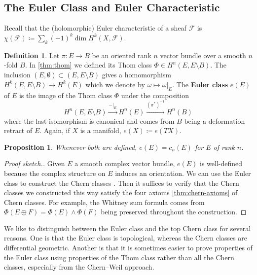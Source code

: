\documentclass{report}
\theoremstyle{plain}
\newtheorem{proposition}[theorem]{Proposition}
\theoremstyle{definition}
\newtheorem{definition}[theorem]{Definition}
\theoremstyle{remark}
\newcommand{\cF}{\mathcal{F}}
\begin{document}
\subsection{The Euler Class and Euler Characteristic}

Recall that the (holomorphic) Euler characteristic of a sheaf $\cF$ is
$\chi(\cF) \coloneqq \sum_k (-1)^k \dim H^k(X, \cF)$.

\begin{definition} \label{def:euler-class}
  Let $\pi\colon E \to B$ be an oriented rank $n$ vector bundle over a
  smooth $n$-fold $B$. In \ref{thm:thom} we defined its Thom class
  $\Phi \in H^n(E, E \setminus B)$. The inclusion $(E, \emptyset)
  \subset (E, E \setminus B)$ gives a homomorphism $H^k(E, E \setminus
  B) \to H^k(E)$ which we denote by $\omega \mapsto \omega|_E$. The
  {\bf Euler class} $e(E)$ of $E$ is the image of the Thom class
  $\Phi$ under the composition
  \[ H^n(E, E \setminus B) \xrightarrow{-|_E} H^n(E) \xrightarrow{(\pi^*)^{-1}} H^n(B) \]
  where the last isomorphism is canonical and comes from $B$ being a
  deformation retract of $E$. Again, if $X$ is a manifold, $e(X)
  \coloneqq e(TX)$.
\end{definition}

\begin{proposition} \label{thm:euler-chern}
  Whenever both are defined, $e(E) = c_n(E)$ for $E$ of rank $n$.
\end{proposition}

\begin{proof}[Proof sketch.]
  Given $E$ a smooth complex vector bundle, $e(E)$ is well-defined
  because the complex structure on $E$ induces an orientation. We can
  use the Euler class to construct the Chern classes \cite[Section
    14]{Milnor1974}. Then it suffices to verify that the Chern classes
  we constructed this way satisfy the four axioms
  \ref{thm:chern-axioms} of Chern classes. For example, the Whitney
  sum formula comes from $\Phi(E \oplus F) = \Phi(E) \wedge \Phi(F)$
  being preserved throughout the construction.
\end{proof}

We like to distinguish between the Euler class and the top Chern class
for several reasons. One is that the Euler class is topological,
whereas the Chern classes are differential geometric. Another is that
it is sometimes easier to prove properties of the Euler class using
properties of the Thom class rather than all the Chern classes,
especially from the Chern--Weil approach.
\end{document}
